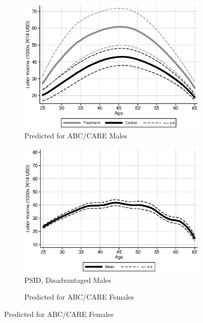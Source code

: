 \begin{figure}
\centering
\caption{Labor Income Profiles, Prediction Based on $\bm{X}_{t},\bm{B}$}\label{fig:labor-income-profiles}
\begin{subfigure}[h]{0.4\textwidth}
		\centering
		\caption{Predicted for ABC/CARE Males} \label{fig:abcare1}
		\includegraphics[width=\textwidth]{output/labor_25-60_male_2.eps}
\end{subfigure}%
\begin{subfigure}[h]{0.4\textwidth}
	\centering
	\caption{PSID, Disadvantaged Males} \label{fig:psid1}
		\includegraphics[width=\textwidth]{output/psid_incomeprofiles_s1.eps}
\end{subfigure}
\begin{subfigure}[h]{0.4\textwidth}
		\centering
		\caption{Predicted for ABC/CARE Females} \label{fig:abcare0}

\end{subfigure}
\end{figure}
